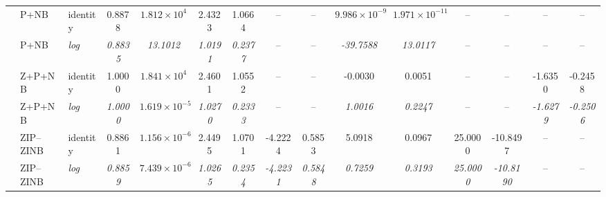 \begin{table}
{\begin{tabular}{l l l c c c c c c c c c c c c}
 & P+NB & identity & 0.8878 & $1.812\times10^{4}$ & 2.4323 & 1.0664 & -- & -- & $9.986\times10^{-9}$ & $1.971\times10^{-11}$ & -- & -- & -- & -- \\
 & P+NB & \textit{log} & \textit{0.8835} & \textit{13.1012} & \textit{1.0191} & \textit{0.2377} & -- & -- & \textit{-39.7588} & \textit{13.0117} & -- & -- & -- & -- \\

 & Z+P+NB & identity & 1.0000 & $1.841\times10^{4}$ & 2.4601 & 1.0552 & -- & -- & -0.0030 & 0.0051 & -- & -- & -1.6350 & -0.2458 \\
 & Z+P+NB & \textit{log} & \textit{1.0000} & $\mathit{1.619\times10^{-5}}$ & \textit{1.0270} & \textit{0.2333} & -- & -- & \textit{1.0016} & \textit{0.2247} & -- & -- & \textit{-1.6279} & \textit{-0.2506} \\

 & ZIP--ZINB & identity & 0.8861 & $1.156\times10^{-6}$ & 2.4495 & 1.0701 & -4.2224 & 0.5853 & 5.0918 & 0.0967 & 25.0000 & -10.8497 & -- & -- \\
 & ZIP--ZINB & \textit{log} & \textit{0.8859} & $\mathit{7.439\times10^{-6}}$ & \textit{1.0265} & \textit{0.2354} & \textit{-4.2231} & \textit{0.5848} & \textit{0.7259} & \textit{0.3193} & \textit{25.0000} & \textit{-10.8190} & -- & -- \\
\bottomrule
\end{tabular}
}%
\end{table}
